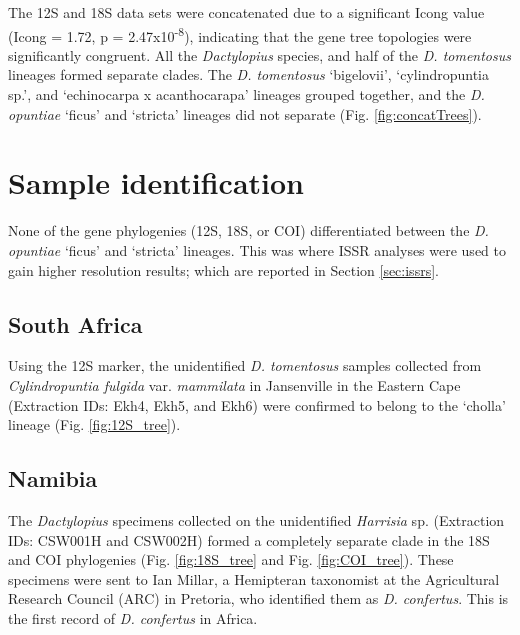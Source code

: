 The 12S and 18S data sets were concatenated due to a significant Icong value (Icong = 1.72, p = 2.47x10\textsuperscript{-8}), indicating that the gene tree topologies were significantly congruent. All the \textit{Dactylopius} species, and half of the \textit{D. tomentosus} lineages formed separate clades. The \textit{D. tomentosus} `bigelovii', `cylindropuntia sp.', and `echinocarpa x acanthocarapa' lineages grouped together, and the \textit{D. opuntiae} `ficus' and `stricta' lineages did not separate (Fig. \ref{fig:concatTrees}).

\section{Sample identification}
None of the gene phylogenies (12S, 18S, or COI) differentiated between the \textit{D. opuntiae} `ficus' and `stricta' lineages. This was where ISSR analyses were used to gain higher resolution results; which are reported in Section \ref{sec:issrs}. 

\subsection{South Africa}
Using the 12S marker, the unidentified \textit{D. tomentosus} samples collected from \textit{Cylindropuntia fulgida} var. \textit{mammilata} in Jansenville in the Eastern Cape (Extraction IDs: Ekh4, Ekh5, and Ekh6) were confirmed to belong to the `cholla' lineage (Fig. \ref{fig:12S_tree}). 

\subsection{Namibia}
The \textit{Dactylopius} specimens collected on the unidentified \textit{Harrisia} sp. (Extraction IDs: CSW001H and CSW002H) formed a completely separate clade in the 18S and COI phylogenies (Fig. \ref{fig:18S_tree} and Fig. \ref{fig:COI_tree}). These specimens were sent to Ian Millar, a Hemipteran taxonomist at the Agricultural Research Council (ARC) in Pretoria, who identified them as \textit{D. confertus}. This is the first record of \textit{D. confertus} in Africa.

